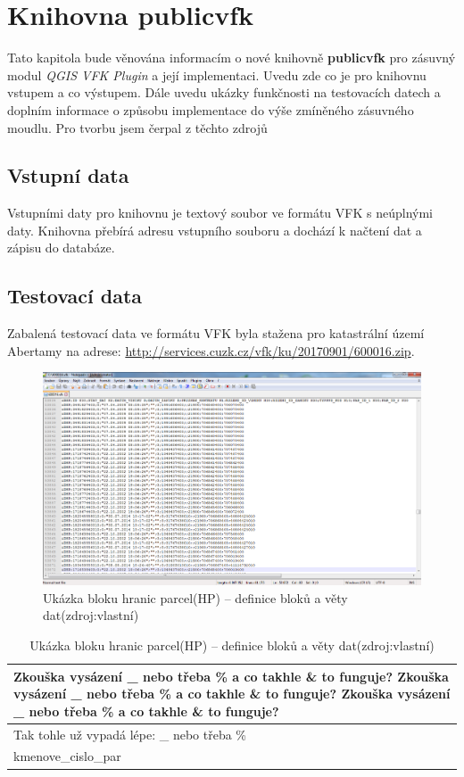 \chapter{Knihovna publicvfk}
\label{4-plugin}
Tato kapitola bude věnována informacím o nové knihovně \textbf{publicvfk} pro zásuvný modul \textit{QGIS VFK Plugin} a její implementaci. Uvedu zde co je pro knihovnu vstupem a co výstupem. Dále uvedu ukázky funkčnosti na testovacích datech a doplním informace o způsobu implementace do výše zmíněného zásuvného moudlu. Pro tvorbu jsem čerpal z těchto zdrojů \cite{cookbook, ucebnicepython}

\section{Vstupní data}
Vstupními daty pro knihovnu je textový soubor ve formátu VFK s neúplnými daty. Knihovna přebírá adresu vstupního souboru a dochází k načtení dat a zápisu do databáze.
\section{Testovací data}
Zabalená testovací data ve formátu VFK byla stažena pro katastrální území Abertamy na adrese: \href{http://services.cuzk.cz/vfk/ku/20170901/600016.zip}{http://services.cuzk.cz/vfk/ku/20170901/600016.zip}.

\begin{figure}[H]
	 \centering
      \includegraphics[width=15cm]{./pictures/testovaci_data.png}
      \caption{Ukázka bloku hranic parcel(HP) -- definice bloků a věty dat(zdroj:vlastní)}
      \label{fig:testovaci_data}
  \end{figure}
\begin{table}  
\caption{Ukázka bloku hranic parcel(HP) -- definice bloků a věty dat(zdroj:vlastní)}
\noindent\begin{tabular}{|p{\textwidth}|}
    \hline
    Zkouška vysázení \_ nebo třeba \% a co takhle \& to funguje? Zkouška vysázení \_ nebo třeba \% a co takhle \& to funguje? Zkouška vysázení \_ nebo třeba \% a co takhle \& to funguje?  \\ \hline
    Tak tohle už vypadá lépe: \_ nebo třeba \% \\ \hline
    kmenove\_cislo\_par \\ \hline
    \hline 
    \end{tabular}
\end{table}

